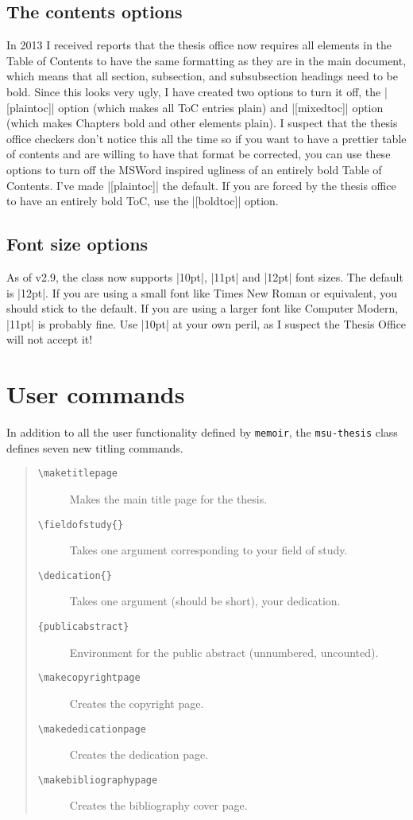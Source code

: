 \documentclass[11pt]{article}
\newcommand*\bs{\textbackslash}
\newcommand*{\pkg}[1]{\texttt{#1}\xspace}
\begin{document}
\subsection{The contents options}
In 2013 I received reports that the thesis office now requires all elements in the Table of Contents to have the same formatting as they are in the main document, which means that all section, subsection, and subsubsection headings need to be bold.  Since this looks very ugly, I have created two options to turn it off, the |[plaintoc]| option (which makes all ToC entries plain) and |[mixedtoc]| option (which makes Chapters bold and other elements plain). I suspect that the thesis office checkers don't notice this all the time so if you want to have a prettier table of contents and are willing to have that format be corrected, you can use these options to turn off the MSWord inspired ugliness of an entirely bold Table of Contents. I've made |[plaintoc]| the default.  If you are forced by the thesis office to have an entirely bold ToC, use the |[boldtoc]| option.
\subsection{Font size options}\label{fontsize}
As of v2.9, the class now supports |10pt|, |11pt| and |12pt| font sizes. The default is |12pt|. If you are using a small font like Times New Roman or equivalent, you should stick to the default. If you are using a larger font like Computer Modern, |11pt| is probably fine. Use |10pt| at your own peril, as I suspect the Thesis Office will not accept it!

\section{User commands}
In addition to all the user functionality defined by \pkg{memoir}, the \pkg{msu-thesis} class defines seven new titling commands. 
\begin{quote}
\begin{description}
\item[\texttt{\bs maketitlepage}] Makes the main title page for the thesis.
\item[\texttt{\bs fieldofstudy\{\}}] Takes one argument corresponding to your field of study.
\item[\texttt{\bs dedication\{\}}] Takes one argument (should be short), your dedication.
\item[\texttt{\{publicabstract\}}] Environment for the public abstract (unnumbered, uncounted).
\item[\texttt{\bs makecopyrightpage}] Creates the copyright page.
\item[\texttt{\bs makededicationpage}] Creates the dedication page.
\item[\texttt{\bs makebibliographypage}] Creates the bibliography cover page.
\end{description}
\end{quote}
\end{document}
